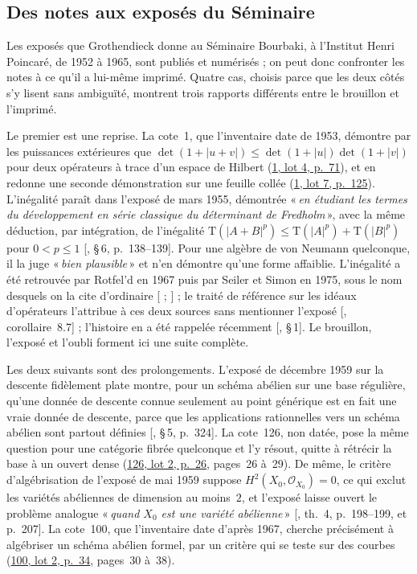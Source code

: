 \documentclass[11pt]{amsart}
\makeatletter
\newcommand{\q}[1]{«\,\textit{#1}\,»}
\def\RHM@first#1--#2\@nil{#1}
\DeclareRobustCommand{\lot}[3]{\begingroup\edef\RHM@pdfpage{\the\numexpr\RHM@first#3--\@nil+1\relax}\href{https://grothendieck.umontpellier.fr/#1.pdf\#page=\RHM@pdfpage}{#1, lot #2, p.~#3}\endgroup}
\newcommand{\lot}[3]{\href{https://grothendieck.commutator.io/\##1/#2/p#3}{#1, lot #2, p.~#3}}
\makeatother
\begin{document}
\subsection{Des notes aux exposés du Séminaire}\label{sub:seminaire}

Les exposés que Grothendieck donne au Séminaire Bourbaki, à l'Institut Henri Poincaré, de 1952 à 1965, sont publiés et numérisés ; on peut donc confronter les notes à ce qu'il a lui-même imprimé. Quatre cas, choisis parce que les deux côtés s'y lisent sans ambiguïté, montrent trois rapports différents entre le brouillon et l'imprimé.

Le premier est une reprise. La cote~1, que l'inventaire date de 1953, démontre par les puissances extérieures que $\det(1+|u+v|) \leq \det(1+|u|)\det(1+|v|)$ pour deux opérateurs à trace d'un espace de Hilbert (\lot{1}{4}{71}), et en redonne une seconde démonstration sur une feuille collée (\lot{1}{7}{125}). L'inégalité paraît dans l'exposé de mars 1955, démontrée \q{en étudiant les termes du développement en série classique du déterminant de Fredholm}, avec la même déduction, par intégration, de l'inégalité $\mathrm{T}(|A+B|^p) \leq \mathrm{T}(|A|^p) + \mathrm{T}(|B|^p)$ pour $0 < p \leq 1$ [\citealp{sb113}, §\,6, p.~138--139]. Pour une algèbre de von Neumann quelconque, il la juge \q{bien plausible} et n'en démontre qu'une forme affaiblie. L'inégalité a été retrouvée par Rotfel'd en 1967 puis par Seiler et Simon en 1975, sous le nom desquels on la cite d'ordinaire [\citealp{rotfeld1967} ; \citealp{seilersimon1975}] ; le traité de référence sur les idéaux d'opérateurs l'attribue à ces deux sources sans mentionner l'exposé [\citealp{simon2005}, corollaire~8.7] ; l'histoire en a été rappelée récemment [\citealp{fmmz2024}, §\,1]. Le brouillon, l'exposé et l'oubli forment ici une suite complète.

Les deux suivants sont des prolongements. L'exposé de décembre 1959 sur la descente fidèlement plate montre, pour un schéma abélien sur une base régulière, qu'une donnée de descente connue seulement au point générique est en fait une vraie donnée de descente, parce que les applications rationnelles vers un schéma abélien sont partout définies [\citealp{sb190}, §\,5, p.~324]. La cote~126, non datée, pose la même question pour une catégorie fibrée quelconque et l'y résout, quitte à rétrécir la base à un ouvert dense (\lot{126}{2}{26}, pages~26 à~29). De même, le critère d'algébrisation de l'exposé de mai 1959 suppose $H^{2}(X_0, \mathcal{O}_{X_0}) = 0$, ce qui exclut les variétés abéliennes de dimension au moins~$2$, et l'exposé laisse ouvert le problème analogue \q{quand $X_0$ est une variété abélienne} [\citealp{sb182}, th.~4, p.~198--199, et p.~207]. La cote~100, que l'inventaire date d'après 1967, cherche précisément à algébriser un schéma abélien formel, par un critère qui se teste sur des courbes (\lot{100}{2}{34}, pages~30 à~38).
\end{document}
